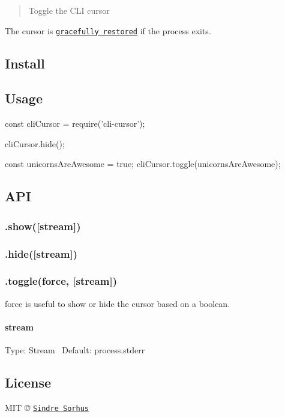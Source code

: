 \begin{quote}
Toggle the C\+LI cursor \end{quote}


The cursor is \href{https://github.com/sindresorhus/restore-cursor}{\tt gracefully restored} if the process exits.

\subsection*{Install}




\subsection*{Usage}


\begin{DoxyCode}
const cliCursor = require('cli-cursor');

cliCursor.hide();

const unicornsAreAwesome = true;
cliCursor.toggle(unicornsAreAwesome);
\end{DoxyCode}


\subsection*{A\+PI}

\subsubsection*{.show(\mbox{[}stream\mbox{]})}

\subsubsection*{.hide(\mbox{[}stream\mbox{]})}

\subsubsection*{.toggle(force, \mbox{[}stream\mbox{]})}

{\ttfamily force} is useful to show or hide the cursor based on a boolean.

\paragraph*{stream}

Type\+: {\ttfamily Stream}~\newline
 Default\+: {\ttfamily process.\+stderr}

\subsection*{License}

M\+IT © \href{https://sindresorhus.com}{\tt Sindre Sorhus} 